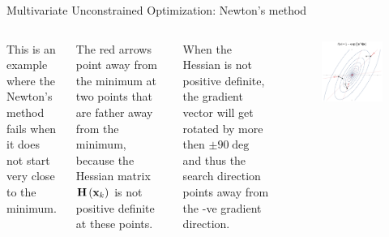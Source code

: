 \documentclass[aspectratio=169]{beamer}
\def\mf{\ensuremath\mathbf}
\def\lp{\ensuremath\left(}
\def\rp{\ensuremath\right)}
\newcommand{\ct}[1]{\lp #1\rp}
\begin{document}
\begin{frame}{Multivariate Unconstrained Optimization: Newton's method}
  \begin{columns}
    This is an example where the Newton's method fails when it does not start very close to the minimum.\vspace{0.2cm}

    The red arrows point away from the minimum at two points that are father away from the minimum, because the Hessian matrix $\mf{H}\ct{\mf{x}_k}$ is not positive definite at these points.
    \vspace{0.2cm}

    When the Hessian is not positive definite, the gradient vector will get rotated by more then $\pm 90\deg$ and thus the search direction points away from the -ve gradient direction.

    \begin{figure}
      \centering
      \includegraphics[width=1\textwidth]{figs/newton_vs_gradient_descent_failure.pdf}
    \end{figure}
  \end{columns}
\end{frame}
\end{document}
